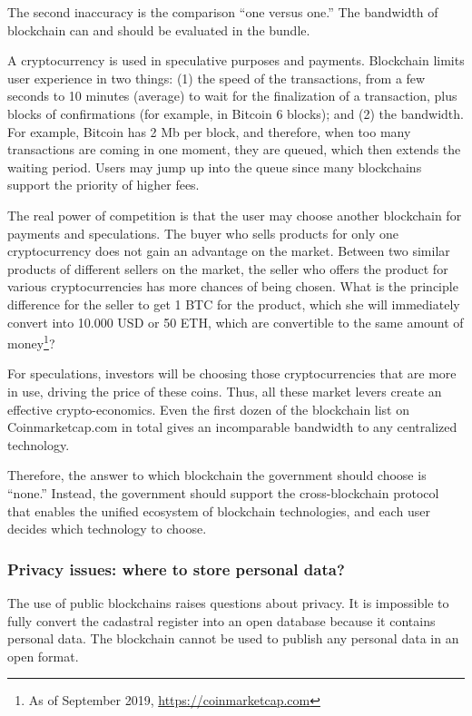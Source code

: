 \begin{multicols}{2}
The second inaccuracy is the comparison “one versus one.” The bandwidth of blockchain can and should be evaluated in the bundle.

A cryptocurrency is used in speculative purposes and payments. Blockchain limits user experience in two things: (1) the speed of the transactions, from a few seconds to 10 minutes (average) to wait for the finalization of a transaction, plus blocks of confirmations (for example, in Bitcoin 6 blocks); and (2) the bandwidth. For example, Bitcoin has 2 Mb per block, and therefore, when too many transactions are coming in one moment, they are queued, which then extends the waiting period. Users may jump up into the queue since many blockchains support the priority of higher fees.

The real power of competition is that the user may choose another blockchain for payments and speculations. The buyer who sells products for only one cryptocurrency does not gain an advantage on the market. Between two similar products of different sellers on the market, the seller who offers the product for various cryptocurrencies has more chances of being chosen. What is the principle difference for the seller to get 1 BTC for the product, which she will immediately convert into 10.000 USD or 50 ETH, which are convertible to the same amount of money\footnote{As of September 2019, \url{https://coinmarketcap.com}}?

For speculations, investors will be choosing those cryptocurrencies that are more in use, driving the price of these coins. Thus, all these market levers create an effective crypto-economics. Even the first dozen of the blockchain list on Coinmarketcap.com in total gives an incomparable bandwidth to any centralized technology.

Therefore, the answer to which blockchain the government should choose is “none.” Instead, the government should support the cross-blockchain protocol that enables the unified ecosystem of blockchain technologies, and each user decides which technology to choose.

\subsubsection{Privacy issues: where to store personal data?}\label{subsubsec-5.2.4}

The use of public blockchains raises questions about privacy. It is impossible to fully convert the cadastral register into an open database because it contains personal data. The blockchain cannot be used to publish any personal data in an open format.


\end{multicols}
